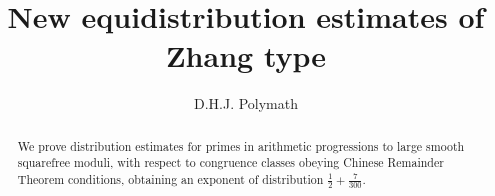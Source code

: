\documentclass[12pt,a4paper,reqno]{amsart}
\numberwithin{equation}{section}
\theoremstyle{plain}
\theoremstyle{definition}
\begin{document}
\title[Equidistribution of primes in arithmetic progressions]{New equidistribution estimates of Zhang type}

\author{D.H.J. Polymath}
\address{http://michaelnielsen.org/polymath1/index.php}


\begin{abstract} We prove distribution estimates for primes in
  arithmetic progressions to large smooth squarefree moduli, with
  respect to congruence classes obeying Chinese Remainder Theorem
  conditions, obtaining an exponent of distribution $\frac{1}{2} +
  \frac{7}{300}$.
\end{abstract}


\maketitle
\end{document}
